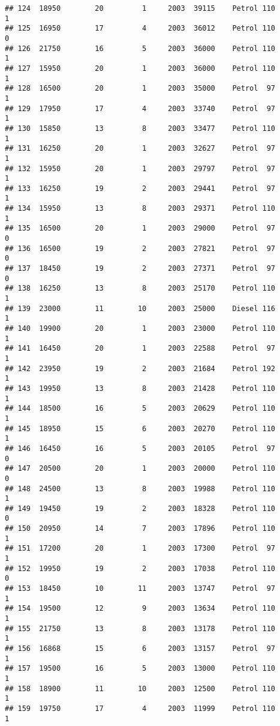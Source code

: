 \documentclass[]{article}
\begin{document}
\begin{verbatim}
## 124  18950        20         1     2003  39115    Petrol 110         1
## 125  16950        17         4     2003  36012    Petrol 110         0
## 126  21750        16         5     2003  36000    Petrol 110         1
## 127  15950        20         1     2003  36000    Petrol 110         1
## 128  16500        20         1     2003  35000    Petrol  97         1
## 129  17950        17         4     2003  33740    Petrol  97         1
## 130  15850        13         8     2003  33477    Petrol 110         1
## 131  16250        20         1     2003  32627    Petrol  97         1
## 132  15950        20         1     2003  29797    Petrol  97         1
## 133  16250        19         2     2003  29441    Petrol  97         1
## 134  15950        13         8     2003  29371    Petrol 110         1
## 135  16500        20         1     2003  29000    Petrol  97         0
## 136  16500        19         2     2003  27821    Petrol  97         0
## 137  18450        19         2     2003  27371    Petrol  97         0
## 138  16250        13         8     2003  25170    Petrol 110         1
## 139  23000        11        10     2003  25000    Diesel 116         1
## 140  19900        20         1     2003  23000    Petrol 110         1
## 141  16450        20         1     2003  22588    Petrol  97         1
## 142  23950        19         2     2003  21684    Petrol 192         1
## 143  19950        13         8     2003  21428    Petrol 110         1
## 144  18500        16         5     2003  20629    Petrol 110         1
## 145  18950        15         6     2003  20270    Petrol 110         1
## 146  16450        16         5     2003  20105    Petrol  97         0
## 147  20500        20         1     2003  20000    Petrol 110         0
## 148  24500        13         8     2003  19988    Petrol 110         1
## 149  19450        19         2     2003  18328    Petrol 110         0
## 150  20950        14         7     2003  17896    Petrol 110         1
## 151  17200        20         1     2003  17300    Petrol  97         1
## 152  19950        19         2     2003  17038    Petrol 110         0
## 153  18450        10        11     2003  13747    Petrol  97         1
## 154  19500        12         9     2003  13634    Petrol 110         1
## 155  21750        13         8     2003  13178    Petrol 110         1
## 156  16868        15         6     2003  13157    Petrol  97         1
## 157  19500        16         5     2003  13000    Petrol 110         1
## 158  18900        11        10     2003  12500    Petrol 110         1
## 159  19750        17         4     2003  11999    Petrol 110         1

\end{verbatim}
\end{document}
